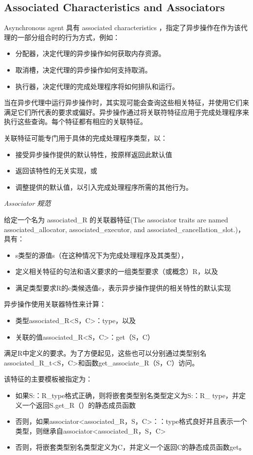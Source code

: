 \subsection{Associated Characteristics and Associators}
Asynchronous agent 具有 associated characteristics ，指定了异步操作在作为该代理的一部分组合时的行为方式，例如：
\begin{itemize}
	\item 分配器，决定代理的异步操作如何获取内存资源。
	\item 取消槽，决定代理的异步操作如何支持取消。
	\item 执行器，决定代理的完成处理程序将如何排队和运行。
\end{itemize}

当在异步代理中运行异步操作时，其实现可能会查询这些相关特征，并使用它们来满足它们所代表的要求或偏好。异步操作通过将关联符特征应用于完成处理程序来执行这些查询。每个特征都有相应的关联特征。

关联特征可能专门用于具体的完成处理程序类型，以：
\begin{itemize}
	\item 接受异步操作提供的默认特性，按原样返回此默认值
	\item 返回该特性的无关实现，或
	\item 调整提供的默认值，以引入完成处理程序所需的其他行为。
\end{itemize}

\emph{Associator 规范}

给定一个名为 associated\_R 的关联器特征(The associator traits are named associated\_allocator, associated\_executor, and associated\_cancellation\_slot.)，具有：
\begin{itemize}
	\item s类型的源值s（在这种情况下为完成处理程序及其类型），
	\item 定义相关特征的句法和语义要求的一组类型要求（或概念）R，以及
	\item 满足类型要求R的c类候选值c，表示异步操作提供的相关特性的默认实现
\end{itemize}

异步操作使用关联器特性来计算：
\begin{itemize}
	\item 类型associated\_R<S，C>：type，以及
	\item 关联的值associated\_R<S，C>：get（S，C）
\end{itemize}
满足R中定义的要求。为了方便起见，这些也可以分别通过类型别名associated\_R\_t<S，C>和函数get\_associate\_R（S，C）访问。

该特征的主要模板被指定为：
\begin{itemize}
	\item 如果S:：R\_type格式正确，则将嵌套类型别名类型定义为S:：R\_ type，并定义一个返回S.get\_R（）的静态成员函数
	\item 否则，如果associator<associated\_R，S，C>：：type格式良好并且表示一个类型，则继承自associator<associated\_R，S，C>
	\item 否则，将嵌套类型别名类型定义为C，并定义一个返回C的静态成员函数get。
\end{itemize}




